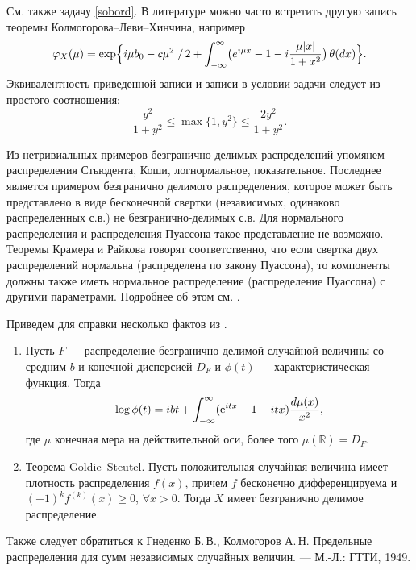 \begin{remark} См. также задачу \ref{sobord}. 
В литературе можно часто встретить другую запись теоремы Колмогорова--Леви--Хинчина, например 
\[
\varphi_{X}(\mu)
=\exp \Bigl\{  i\mu b_0-c\mu^2\left.\right/2+
\int_{-\infty}^{\infty} \bigl( e^{i\mu x}-1-i\frac{\mu|x|}{1+x^2} \bigr)\, \theta(dx) 
\Bigr\}.
\]
Эквивалентность приведенной записи и записи в условии задачи следует из простого соотношения:
\[
\frac{y^2}{1+y^2}\leq \max\{1,y^2\}\leq \frac{2y^2}{1+y^2}.
\]

Из нетривиальных примеров безгранично делимых распределений упомянем распределения Стьюдента, Коши, логнормальное, показательное. Последнее является примером безгранично де\-ли\-мо\-го распределения, которое может быть представлено в виде бесконечной свертки (независимых, одинаково распределенных с.в.) не безгранично-делимых с.в. Для нормального  распределения и распределения Пуассона такое представление не возможно. Теоремы Крамера и Райкова говорят соответственно, что если свертка двух распределений нормальна (распределена по закону Пуассона), то компоненты должны также иметь нормальное распределение (распределение Пуассона) с другими параметрами. Подробнее об этом см. \cite{stoianov}. 

Приведем для справки несколько фактов из \cite{Gupta}.
\begin{enumerate}
\item
Пусть $F$ ---  распределение безгранично делимой случайной величины со средним $b$ и конечной дисперсией $D_F$ и  $\phi(t)$ --- характеристическая функция. Тогда 
$$
\log\phi(t)=ibt+\int_{-\infty}^{\infty}({\rm e}^{itx}-1-itx)\frac{d\mu(x)}{x^2},
$$
где $\mu$ конечная мера на действительной оси, более того $\mu(\mathbb{R}) = D_F$.
\item Теорема Goldie--Steutel. Пусть положительная случайная величина имеет плотность распределения $f(x)$, причем $f$ бесконечно дифференцируема и $(-1)^k f^{(k)}(x)\geq 0$, $\forall x>0$. Тогда $X$ имеет безгранично делимое распределение. 
\end{enumerate}

Также следует обратиться к Гнеденко Б.\,В., Колмогоров А.\,Н. Предельные распределения для сумм независимых случайных величин. — М.-Л.: ГТТИ, 1949.

\end{remark}

